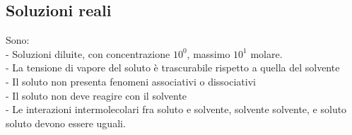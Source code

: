 \subsection{Soluzioni reali}
Sono:\\
\tab- Soluzioni diluite, con concentrazione $10^0$, massimo $10^1$ molare.\\
\tab- La tensione di vapore del soluto è trascurabile rispetto a quella del solvente\\
\tab- Il soluto non presenta fenomeni associativi o dissociativi \\
\tab- Il soluto non deve reagire con il solvente\\
\tab- Le interazioni intermolecolari fra soluto e solvente, solvente solvente, e soluto soluto devono essere uguali. 